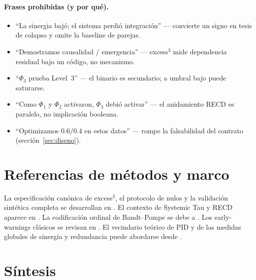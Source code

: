 \documentclass[11pt,a4paper]{article}
\begin{document}
\paragraph{Frases prohibidas (y por qu\'e).}
\begin{itemize}[leftmargin=*,itemsep=2pt]
  \item ``La sinergia baj\'o; el sistema perdi\'o integraci\'on'' --- convierte
  un signo en tesis de colapso y omite la baseline de parejas.
  \item ``Demostramos causalidad / emergencia'' --- excess$^3$ mide
  dependencia residual bajo un c\'odigo, no mecanismo.
  \item ``$\Phi_3$ prueba Level~3'' --- el binario es secundario; a umbral
  bajo puede saturarse.
  \item ``Como $\Phi_1$ y $\Phi_2$ activaron, $\Phi_3$ debi\'o activar'' ---
  el anidamiento RECD es paralelo, no implicaci\'on booleana.
  \item ``Optimizamos $0.6/0.4$ en estos datos'' --- rompe la
  falsabilidad del contrato (secci\'on~\ref{sec:diseno}).
\end{itemize}

\section{Referencias de m\'etodos y marco}
\label{sec:mapa}

La especificaci\'on can\'onica de excess$^3$, el protocolo de nulos y la
validaci\'on sint\'etica completa se desarrollan en
\citep{Padilla2026excess3}. El contexto de Systemic Tau y RECD aparece en
\citep{Padilla2026framework}. La codificaci\'on ordinal de Bandt--Pompe se
debe a \citep{BandtPompe2002}. Los early-warnings cl\'asicos se revisan en
\citep{Scheffer2009}. El vecindario te\'orico de PID y de las medidas
globales de sinergia y redundancia puede abordarse desde
\citep{Williams2010,Rosas2019,Timme2018}.

\section{S\'intesis}
\label{sec:bolsillo}
\end{document}
